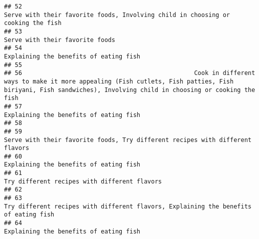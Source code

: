 \documentclass[
]{article}
\begin{document}
\begin{verbatim}
## 52                                                                                                                              Serve with their favorite foods, Involving child in choosing or cooking the fish
## 53                                                                                                                                                                               Serve with their favorite foods
## 54                                                                                                                                                                        Explaining the benefits of eating fish
## 55                                                                                                                                                                                                              
## 56                                                Cook in different ways to make it more appealing (Fish cutlets, Fish patties, Fish biriyani, Fish sandwiches), Involving child in choosing or cooking the fish
## 57                                                                                                                                                                        Explaining the benefits of eating fish
## 58                                                                                                                                                                                                              
## 59                                                                                                                                 Serve with their favorite foods, Try different recipes with different flavors
## 60                                                                                                                                                                        Explaining the benefits of eating fish
## 61                                                                                                                                                                  Try different recipes with different flavors
## 62                                                                                                                                                                                                              
## 63                                                                                                                          Try different recipes with different flavors, Explaining the benefits of eating fish
## 64                                                                                                                                                                        Explaining the benefits of eating fish

\end{verbatim}
\end{document}
